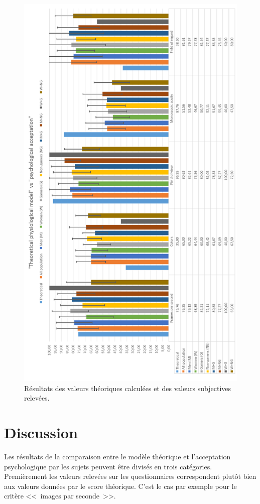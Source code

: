 	\begin{figure}
		\centering
		\includegraphics[scale=.7]{Figures/ResultsComparison}
		\caption{Résultats des valeurs théoriques calculées et des valeurs subjectives relevées.}
		\label{fig:results_comparison}
	\end{figure}
	
	\section{Discussion}
	\par Les résultats de la comparaison entre le modèle théorique et l'acceptation psychologique par les sujets peuvent être divisés en trois catégories. Premièrement les valeurs relevées sur les questionnaires correspondent plutôt bien aux valeurs données par le score théorique. C'est le cas par exemple pour le critère <<~images par seconde~>>.
	
